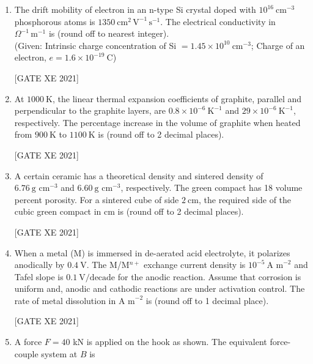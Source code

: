 \documentclass[journal,12pt,onecolumn]{IEEEtran}
\theoremstyle{remark}
\begin{document}
\begin{enumerate}[resume]
\hfill[GATE XE 2021]

\item The drift mobility of electron in an n-type Si crystal doped with $10^{16}\ \text{cm}^{-3}$ phosphorous atoms is $1350\ \text{cm}^2\,\text{V}^{-1}\,\text{s}^{-1}$. The electrical conductivity in $\Omega^{-1}\,\text{m}^{-1}$ is \underline{\hspace{2cm}} (round off to nearest integer).\\
(Given: Intrinsic charge concentration of Si $=1.45\times 10^{10}\ \text{cm}^{-3}$; Charge of an electron, $e=1.6\times 10^{-19}\ \text{C}$)

\hfill[GATE XE 2021]

\item At $1000\ \text{K}$, the linear thermal expansion coefficients of graphite, parallel and perpendicular to the graphite layers, are $0.8\times 10^{-6}\ \text{K}^{-1}$ and $29\times 10^{-6}\ \text{K}^{-1}$, respectively. The percentage increase in the volume of graphite when heated from $900\ \text{K}$ to $1100\ \text{K}$ is \underline{\hspace{2cm}} (round off to 2 decimal places).

\hfill[GATE XE 2021]

\item A certain ceramic has a theoretical density and sintered density of $6.76\ \text{g cm}^{-3}$ and $6.60\ \text{g cm}^{-3}$, respectively. The green compact has 18 volume percent porosity. For a sintered cube of side $2\ \text{cm}$, the required side of the cubic green compact in cm is \underline{\hspace{2cm}} (round off to 2 decimal places).

\hfill[GATE XE 2021]

\item When a metal (M) is immersed in de-aerated acid electrolyte, it polarizes anodically by $0.4\ \text{V}$. The M/M$^{n+}$ exchange current density is $10^{-5}\ \text{A m}^{-2}$ and Tafel slope is $0.1\ \text{V/decade}$ for the anodic reaction. Assume that corrosion is uniform and, anodic and cathodic reactions are under activation control. The rate of metal dissolution in $\text{A m}^{-2}$ is \underline{\hspace{2cm}} (round off to 1 decimal place).

\hfill[GATE XE 2021]

\item A force $F=40$ kN is applied on the hook as shown. The equivalent force-couple system at $B$ is


\end{enumerate}
\end{document}
